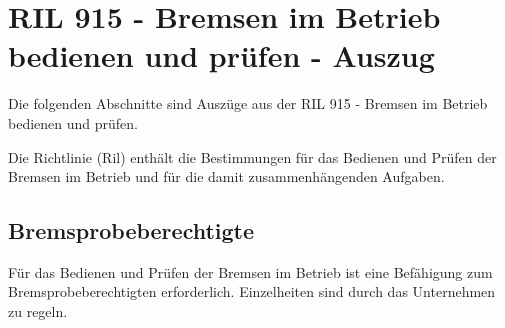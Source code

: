 \section{RIL 915 - Bremsen im Betrieb bedienen und prüfen - Auszug}\label{sec:ABremsen}
Die folgenden Abschnitte sind Auszüge aus der RIL 915 - Bremsen im Betrieb bedienen und prüfen.\cite{RIL915}\par
Die Richtlinie (Ril) enthält die Bestimmungen für das Bedienen und Prüfen der Bremsen im Betrieb und für die damit zusammenhängenden Aufgaben.
\subsection{Bremsprobeberechtigte}
Für das Bedienen und Prüfen der Bremsen im Betrieb ist eine Befähigung zum Bremsprobeberechtigten erforderlich. Einzelheiten sind durch das Unternehmen zu regeln.
